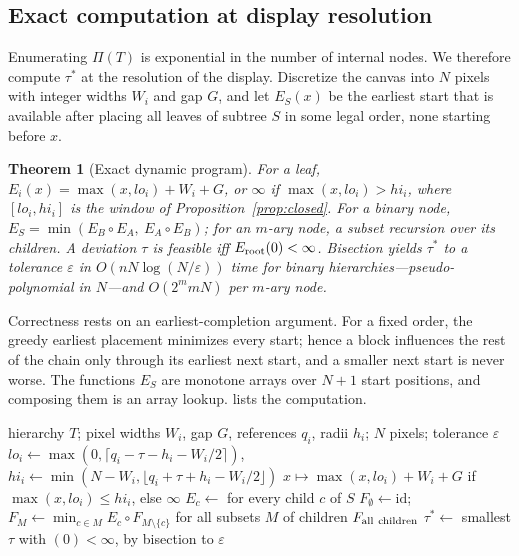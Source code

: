 \documentclass[review]{vgtc}                 %
\newtheorem{theorem}{Theorem}
\begin{document}
\subsection{Exact computation at display resolution}
Enumerating $\Pi(T)$ is exponential in the number of internal nodes. We therefore compute $\tau^*$ at the resolution of the display. Discretize the canvas into $N$ pixels with integer widths $W_i$ and gap $G$, and let $E_S(x)$ be the earliest start that is available after placing all leaves of subtree $S$ in some legal order, none starting before $x$.

\begin{theorem}[Exact dynamic program]\label{thm:dp}
For a leaf, $E_i(x)=\max(x,lo_i)+W_i+G$, or $\infty$ if $\max(x,lo_i)>hi_i$, where $[lo_i,hi_i]$ is the window of Proposition~\ref{prop:closed}. For a binary node, $E_S=\min(E_B\circ E_A,\ E_A\circ E_B)$; for an $m$-ary node, a subset recursion over its children. A deviation $\tau$ is feasible iff $E_{\rm root}(0)<\infty$. Bisection yields $\tau^*$ to a tolerance $\varepsilon$ in $O(nN\log(N/\varepsilon))$ time for binary hierarchies---pseudo-polynomial in $N$---and $O(2^m mN)$ per $m$-ary node.
\end{theorem}
Correctness rests on an earliest-completion argument. For a fixed order, the greedy earliest placement minimizes every start; hence a block influences the rest of the chain only through its earliest next start, and a smaller next start is never worse. The functions $E_S$ are monotone arrays over $N+1$ start positions, and composing them is an array lookup.  lists the computation.

\begin{algorithm}[t]
\caption{Certificate $\tau^*$ at display resolution (Theorem~\ref{thm:dp}).}\label{alg:cert}
\begin{algorithmic}[1]
\Require hierarchy $T$; pixel widths $W_i$, gap $G$, references $q_i$, radii $h_i$; $N$ pixels; tolerance $\varepsilon$
 
    \State $lo_i\gets\max(0,\lceil q_i-\tau-h_i-W_i/2\rceil)$, $hi_i\gets\min(N-W_i,\lfloor q_i+\tau+h_i-W_i/2\rfloor)$
    \State \Return $x\mapsto\max(x,lo_i)+W_i+G$ if $\max(x,lo_i)\le hi_i$, else $\infty$
  \EndIf
  \State $E_c\gets$  for every child $c$ of $S$
  \State $F_\emptyset\gets\mathrm{id}$;\ \ $F_M\gets\min_{c\in M}E_c\circ F_{M\setminus\{c\}}$ for all subsets $M$ of children
  \State \Return $F_{\rm all\ children}$ 
\EndFunction
\State $\tau^*\gets$ smallest $\tau$ with $(0)<\infty$, by bisection to $\varepsilon$
\end{algorithmic}
\end{algorithm}
\end{document}

